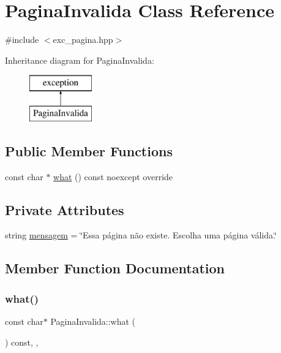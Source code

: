 \hypertarget{classPaginaInvalida}{}\section{Pagina\+Invalida Class Reference}
\label{classPaginaInvalida}


{\ttfamily \#include $<$exc\+\_\+pagina.\+hpp$>$}

Inheritance diagram for Pagina\+Invalida\+:\begin{figure}[H]
\begin{center}
\leavevmode
\includegraphics[height=2.000000cm]{classPaginaInvalida}
\end{center}
\end{figure}
\subsection*{Public Member Functions}
\begin{DoxyCompactItemize}
\item 
const char $\ast$ \hyperlink{classPaginaInvalida_a4022cf89811330d6505d8ed01cbc9132}{what} () const noexcept override
\end{DoxyCompactItemize}
\subsection*{Private Attributes}
\begin{DoxyCompactItemize}
\item 
string \hyperlink{classPaginaInvalida_aebeaffd6e9c09496a4a9d6ed2b87d0f9}{mensagem} = \char`\"{}Essa página não existe. Escolha uma página válida.\char`\"{}
\end{DoxyCompactItemize}


\subsection{Member Function Documentation}
\mbox{\label{classPaginaInvalida_a4022cf89811330d6505d8ed01cbc9132}} 
\subsubsection{\texorpdfstring{what()}{what()}}
{\footnotesize\ttfamily const char$\ast$ Pagina\+Invalida\+::what (\begin{DoxyParamCaption}{ }\end{DoxyParamCaption}) const\hspace{0.3cm}{\ttfamily [inline]}, {\ttfamily [override]}, {\ttfamily [noexcept]}}



